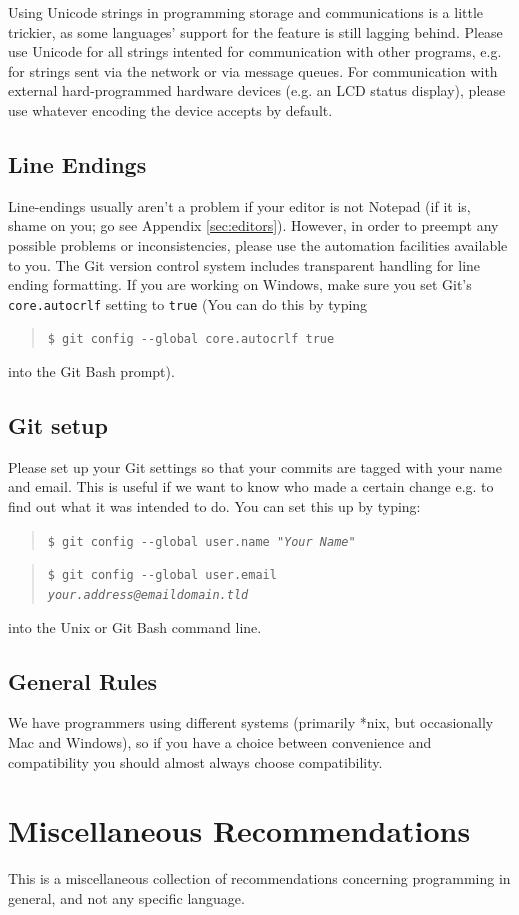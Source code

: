 \documentclass[12pt]{article}
\newcommand{\var}[1]{\texttt{#1}}
\newcommand{\commandline}[1]{\begin{quotation}\texttt{\$ #1}\end{quotation}}
\newcommand{\clloption}[1]{-{}-#1}
\newcommand{\toreplace}[1]{\emph{#1}}
\begin{document}
Using Unicode strings in programming storage and communications is a little trickier, as some languages' support for the feature is still lagging behind. Please use Unicode for all strings intented for communication with other programs, e.g. for strings sent via the network or via message queues. For communication with external hard-programmed hardware devices (e.g. an LCD status display), please use whatever encoding the device accepts by default.

\subsection{Line Endings} Line-endings usually aren't a problem if your editor is not Notepad (if it is, shame on you; go see Appendix \ref{sec:editors}). However, in order to preempt any possible problems or inconsistencies, please use the automation facilities available to you. The Git version control system includes transparent handling for line ending formatting. If you are working on Windows, make sure you set Git's \var{core.autocrlf} setting to \var{true} (You can do this by typing \commandline{git config \clloption{global} core.autocrlf true} into the Git Bash prompt).

\subsection{Git setup} Please set up your Git settings so that your commits are tagged with your name and email. This is useful if we want to know who made a certain change e.g. to find out what it was intended to do. You can set this up by typing:
        \commandline{git config \clloption{global} user.name "\toreplace{Your Name}"}
        \commandline{git config \clloption{global} user.email\\
        \toreplace{your.address@emaildomain.tld}}
into the Unix or Git Bash command line.

\subsection{General Rules} We have programmers using different systems (primarily *nix, but occasionally Mac and Windows), so if you have a choice between convenience and compatibility you should almost always choose compatibility.

\section{Miscellaneous Recommendations}
This is a miscellaneous collection of recommendations concerning programming in general, and not any specific language.
\end{document}

